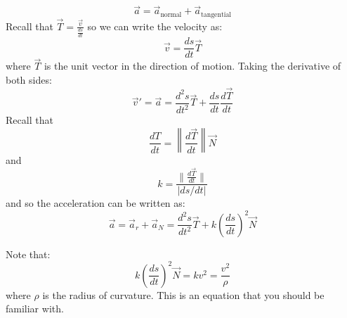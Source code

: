 \begin{itemize}
    \begin{equation}
        \vec{a} = \vec{a}_\text{normal} + \vec{a}_\text{tangential}
    \end{equation}
    Recall that $\vec{T} = \frac{\vec{v}}{\frac{ds}{dt}}$ so we can write the velocity as:
    \begin{equation}
        \vec{v} = \frac{ds}{dt} \vec{T}
    \end{equation} 
    where $\vec{T}$ is the unit vector in the direction of motion. Taking the derivative of both sides:
    \begin{equation}
        \vec{v}' = \vec{a} = \frac{d^2s}{dt^2}\vec{T} + \frac{ds}{dt} \frac{d\vec{T}}{dt}
    \end{equation}
    Recall that
    \begin{equation}
    \frac{dT}{dt} = \left\lVert \frac{d\vec{T}}{dt}\right\rVert \vec{N}
    \end{equation}
    and
    \begin{equation}
        k= \frac{\lVert \frac{d\vec{T}}{dt} \rVert}{|ds/dt|}
    \end{equation}
    and so the acceleration can be written as:
    \begin{equation}
        \vec{a} = \vec{a}_r + \vec{a}_N = \frac{d^2s}{dt^2}\vec{T} + k\left(\frac{ds}{dt}\right)^2 \vec{N}
    \end{equation}
    \begin{idea}
        Note that:
        \begin{equation}
            k\left(\frac{ds}{dt}\right)^2 \vec{N} = kv^2 = \frac{v^2}{\rho}
        \end{equation}
        where $\rho$ is the radius of curvature. This is an equation that you should be familiar with.
    \end{idea}
\end{itemize}